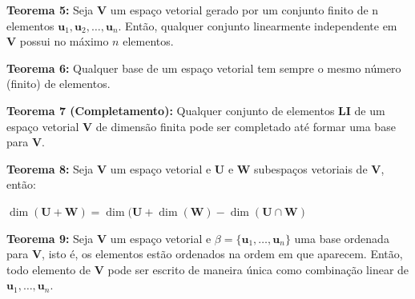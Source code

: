 \noindent\textbf{Teorema 5:} Seja $\mathbf{V}$ um espaço vetorial gerado por um conjunto finito de n elementos $\mathbf{u}_1, \mathbf{u}_2, \ldots, \mathbf{u}_n$. Então, qualquer conjunto linearmente independente em $\mathbf{V}$ possui no máximo $n$ elementos.

\noindent\textbf{Teorema 6:} Qualquer base de um espaço vetorial tem sempre o mesmo número (finito) de elementos.

\noindent\textbf{Teorema 7 (Completamento):} Qualquer conjunto de elementos \textbf{LI} de um espaço vetorial $\mathbf{V}$ de dimensão finita pode ser completado até formar uma base para $\mathbf{V}$.

\noindent\textbf{Teorema 8:} Seja $\mathbf{V}$ um espaço vetorial e $\mathbf{U}$ e $\mathbf{W}$ subespaços vetoriais de $\mathbf{V}$, então:

\centerline{$\dim(\mathbf{U} + \mathbf{W}) = \dim(\mathbf{U} + \dim(\mathbf{W}) - \dim(\mathbf{U} \cap \mathbf{W})$}
  
\noindent\textbf{Teorema 9:} Seja $\mathbf{V}$ um espaço vetorial e $\beta = \{\mathbf{u}_1, \ldots,\mathbf{u}_n\}$ uma base ordenada para $\mathbf{V}$, isto é, os elementos estão ordenados na ordem em que aparecem. Então, todo elemento de $\mathbf{V}$ pode ser escrito de maneira única como combinação linear de $\mathbf{u}_1, \ldots, \mathbf{u}_n$.

